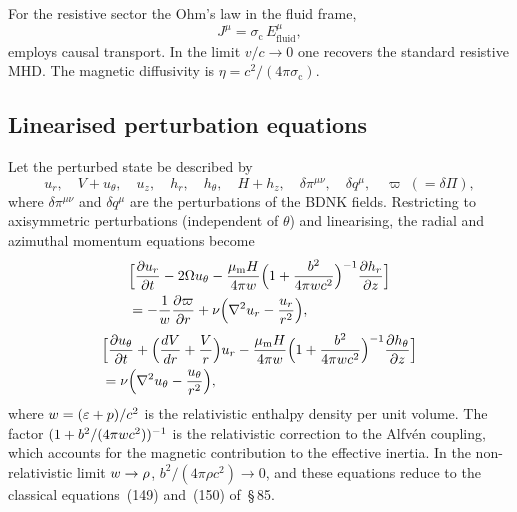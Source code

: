For the resistive sector the Ohm's law in the fluid frame,
\begin{equation}
  J^{\mu}
  = \sigma_{\mathrm{c}}\,E^{\mu}_{\mathrm{fluid}},
  \label{eq:rel-9-Ohm}
\end{equation}
employs causal transport.  In the limit
$v/c \to 0$ one recovers the standard resistive MHD.
The magnetic diffusivity is $\eta = c^2/(4\pi\sigma_{\mathrm{c}})$.

\subsection{Linearised perturbation equations}
\label{sec:rel-87-pert}

Let the perturbed state be described by
\begin{equation}
  u_r,\quad V + u_\theta,\quad u_z,\quad
  h_r,\quad h_\theta,\quad H + h_z,\quad
  \delta\pi^{\mu\nu},\quad \delta q^{\mu},\quad
  \varpi\;(=\delta\Pi),
  \label{eq:rel-9-pert-vars}
\end{equation}
where $\delta\pi^{\mu\nu}$ and $\delta q^{\mu}$ are the perturbations of
the BDNK fields.  Restricting to axisymmetric perturbations
(independent of $\theta$) and linearising, the radial and azimuthal
momentum equations become
\begin{align}
  
  &\Bigl[\frac{\partial u_r}{\partial t} - 2\Omega u_\theta
    - \frac{\mu_{\mathrm{m}} H}{4\pi\enthalpy}
      \Bigl(1+\frac{b^2}{4\pi\enthalpy c^2}\Bigr)^{-1}
      \frac{\partial h_r}{\partial z}\Bigr]
  \notag\\
  &= -\frac{1}{\enthalpy}\frac{\partial \varpi}{\partial r}
    + \nu\Bigl(\nabla^2 u_r - \frac{u_r}{r^2}\Bigr),
  \label{eq:rel-9-149R}
\end{align}
\begin{align}
  
  &\Bigl[\frac{\partial u_\theta}{\partial t}
    + \Bigl(\frac{dV}{dr}+\frac{V}{r}\Bigr)u_r
    - \frac{\mu_{\mathrm{m}} H}{4\pi\enthalpy}
      \Bigl(1+\frac{b^2}{4\pi\enthalpy c^2}\Bigr)^{-1}
      \frac{\partial h_\theta}{\partial z}\Bigr]
  \notag\\
  &= \nu\Bigl(\nabla^2 u_\theta - \frac{u_\theta}{r^2}\Bigr),
  \label{eq:rel-9-150R}
\end{align}
where $w = (\varepsilon + p)/c^2$ is the relativistic enthalpy
density per unit volume.  The factor
$(1 + b^2/(4\pi w c^2))^{-1}$ is the relativistic correction to
the Alfv\'en coupling, which accounts for the magnetic contribution to
the effective inertia.  In the non-relativistic limit
$w\to\rho$, $b^2/(4\pi\rho c^2)\to 0$, and these equations
reduce to the classical equations~(149) and~(150) of~\S\,85.

